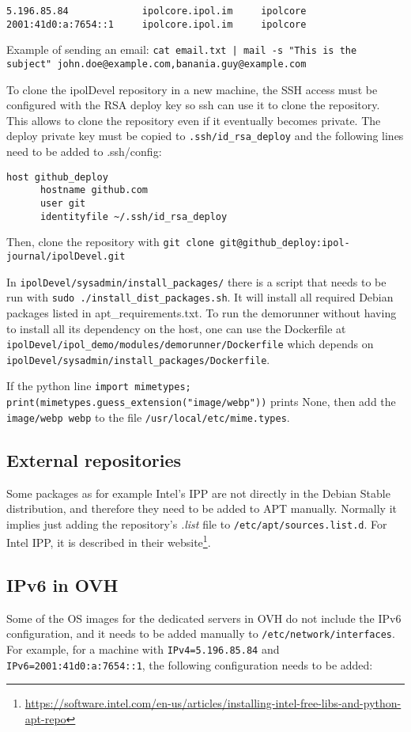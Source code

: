 \documentclass[a4paper,12pt]{article}
\begin{document}
\begin{verbatim}
5.196.85.84             ipolcore.ipol.im     ipolcore
2001:41d0:a:7654::1     ipolcore.ipol.im     ipolcore
\end{verbatim}

Example of sending an email: {\tt cat email.txt | mail -s "This is the subject" john.doe@example.com,banania.guy@example.com}

To clone the ipolDevel repository in a new machine, the SSH access must be configured with the RSA deploy key so ssh can use it to clone the repository. This allows to clone the repository even if it eventually becomes private.
%
The deploy private key must be copied to {\tt .ssh/id\_rsa\_deploy} and the following lines need to be added to .ssh/config:

\begin{verbatim}
host github_deploy
      hostname github.com
      user git
      identityfile ~/.ssh/id_rsa_deploy
\end{verbatim}

Then, clone the repository with {\tt git clone git@github\_deploy:ipol-journal/ipolDevel.git}

In {\tt ipolDevel/sysadmin/install\_packages/} there is a script that needs to be run with {\tt sudo ./install\_dist\_packages.sh}. It will install all required Debian packages listed in apt\_requirements.txt.
To run the demorunner without having to install all its dependency on the host, one can use the Dockerfile at {\tt ipolDevel/ipol\_demo/modules/demorunner/Dockerfile} which depends on {\tt ipolDevel/sysadmin/install\_packages/Dockerfile}.

If the python line {\tt import mimetypes; print(mimetypes.guess\_extension("image/webp"))} prints None, then add the {\tt image/webp webp} to the file {\tt /usr/local/etc/mime.types}.

\subsection{External repositories}
Some packages as for example Intel's IPP are not directly in the Debian Stable distribution, and therefore they need to be added to APT manually. Normally it implies just adding the repository's \emph{.list} file to {\tt /etc/apt/sources.list.d}.
For Intel IPP, it is described in their website\footnote{\url{https://software.intel.com/en-us/articles/installing-intel-free-libs-and-python-apt-repo}}.

\subsection{IPv6 in OVH}
Some of the OS images for the dedicated servers in OVH do not include the IPv6 configuration, and it needs to be added manually to {\tt /etc/network/interfaces}.
For example, for a machine with {\tt IPv4=5.196.85.84} and {\tt IPv6=2001:41d0:a:7654::1}, the following configuration needs to be added:
\end{document}
